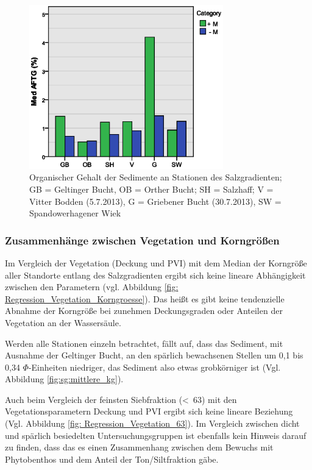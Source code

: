 \begin{figure}[htb]
\centering
\includegraphics[width=0.75\textwidth]{images/salzsedimentauswertung/bar_aftg.eps}
\caption[Organischer Gehalt der Sedimente an Stationen des Salzgradienten]{Organischer Gehalt der Sedimente  an Stationen des Salzgradienten; GB = Geltinger Bucht, OB = Orther Bucht; SH = Salzhaff; V = Vitter Bodden (5.7.2013), G = Griebener Bucht (30.7.2013), SW = Spandowerhagener Wiek}
\label{fig:sg:afdg}
\end{figure}
\FloatBarrier

\subsubsection{Zusammenhänge zwischen Vegetation und Korngrößen}

Im Vergleich der Vegetation (Deckung und PVI) mit dem Median der Korngröße aller Standorte entlang des Salzgradienten ergibt sich keine lineare Abhängigkeit zwischen den Parametern (vgl. Abbildung \ref{fig: Regression_Vegetation_Korngroesse}). Das heißt es gibt keine tendenzielle Abnahme der Korngröße bei zunehmen Deckungsgraden oder Anteilen der Vegetation an der Wassersäule. 

Werden alle Stationen einzeln betrachtet, fällt auf, dass das Sediment, mit Ausnahme der Geltinger Bucht, an den spärlich bewachsenen Stellen um 0,1 bis 0,34 $ \Phi$-Einheiten niedriger, das Sediment also etwas grobkörniger ist (Vgl. Abbildung \ref{fig:sg:mittlere_kg}).

Auch beim Vergleich der feinsten Siebfraktion (\unit{<63}{\mu\metre}) mit den Vegetationsparametern Deckung und PVI ergibt sich keine lineare Beziehung (Vgl. Abbildung \ref{fig: Regression_Vegetation_63}). Im Vergleich zwischen dicht und spärlich besiedelten Untersuchungsgruppen ist ebenfalls kein Hinweis darauf zu finden, dass das es einen Zusammenhang zwischen dem Bewuchs mit Phytobenthos und dem Anteil der Ton/Siltfraktion gäbe. 



